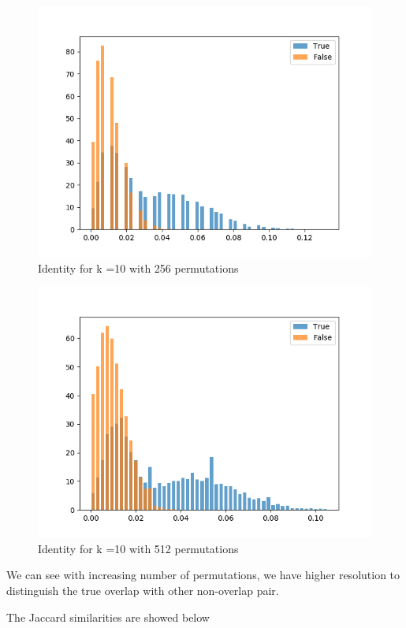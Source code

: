 \documentclass[11pt]{article}
\begin{document}
\begin{figure}[H]
	\centering
	\includegraphics[width = .8\textwidth]{Ecoli_30x_overlap_5000_1000_cutoff_identity_k_10_perm_256.png}
	\caption{Identity for k =10 with 256 permutations}
	\label{fig1}
\end{figure}

\begin{figure}[H]
	\centering
	\includegraphics[width = .8\textwidth]{Ecoli_30x_overlap_5000_1000_cutoff_identity_k_10_perm_512.png}
	\caption{Identity for k =10 with 512 permutations}
	\label{fig1}
\end{figure}	
We can see with increasing number of permutations, we have higher resolution to distinguish the true overlap with other non-overlap pair.

The Jaccard similarities are showed below
\end{document}
